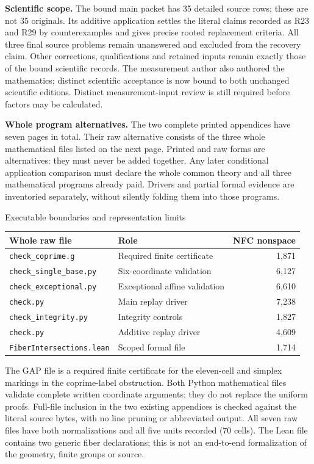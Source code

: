 \documentclass[a4paper,11pt]{article}
\begin{document}
\textbf{Scientific scope.} The bound main packet has 35 detailed source rows;
these are not 35 originals. Its additive application settles the literal
claims recorded as R23 and R29 by counterexamples and gives precise rooted
replacement criteria. All three final source problems remain unanswered and
excluded from the recovery claim. Other corrections, qualifications and
retained inputs remain exactly those of the bound scientific records. The
measurement author also authored the mathematics; distinct scientific
acceptance is now bound to both unchanged scientific editions. Distinct
measurement-input review is still required before factors may be calculated.

\textbf{Whole program alternatives.} The two complete printed appendices have
seven pages in total. Their raw alternative consists of the three whole
mathematical files listed on the next page. Printed and raw forms are
alternatives: they must never be added together. Any later conditional
application comparison must declare the whole common theory and all three
mathematical programs already paid. Drivers and partial formal evidence are
inventoried separately, without silently folding them into those programs.

\newpage
\begin{center}{\large Executable boundaries and representation limits}\end{center}
\begin{center}\small
\begin{tabular}{@{}p{54mm}p{71mm}r@{}}\toprule
Whole raw file & Role & NFC nonspace\\\midrule
\texttt{check\_coprime.g} & Required finite certificate & 1,871 \\
\texttt{check\_single\_base.py} & Six-coordinate validation & 6,127 \\
\texttt{check\_exceptional.py} & Exceptional affine validation & 6,610 \\
\texttt{check.py} & Main replay driver & 7,238 \\
\texttt{check\_integrity.py} & Integrity controls & 1,827 \\
\texttt{check.py} & Additive replay driver & 4,609 \\
\texttt{FiberIntersections.lean} & Scoped formal file & 1,714 \\
\bottomrule\end{tabular}\end{center}

The GAP file is a required finite certificate for the eleven-cell and simplex
markings in the coprime-label obstruction. Both Python mathematical files
validate complete written coordinate arguments; they do not replace the
uniform proofs. Full-file inclusion in the two existing appendices is checked
against the literal source bytes, with no line pruning or abbreviated output.
All seven raw files have both normalizations and all five units recorded
(70 cells). The Lean file contains two generic fiber declarations; this is
not an end-to-end formalization of the geometry, finite groups or source.
\end{document}

